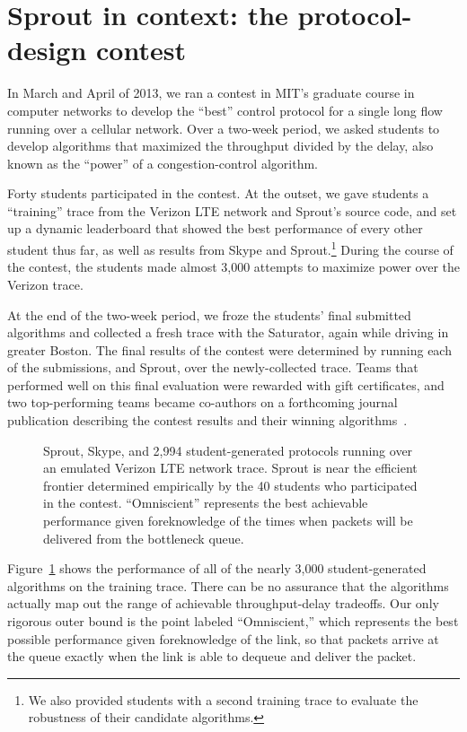 \section{Sprout in context: the protocol-design contest}
\label{s:cc-contest}

In March and April of 2013, we ran a contest in MIT's graduate course in computer
networks to develop the ``best'' control protocol for a single long flow
running over a cellular network. Over a two-week period, we asked
students to develop algorithms that maximized the throughput divided
by the delay, also known as the ``power'' of a congestion-control
algorithm.

Forty students participated in the contest. At the outset, we gave
students a ``training'' trace from the Verizon LTE network and
Sprout's source code, and set up a dynamic leaderboard that showed the
best performance of every other student thus far, as well as results
from Skype and Sprout.\footnote{We also provided students with a
  second training trace to evaluate the robustness of their candidate
  algorithms.} During the course of the contest, the students made
almost 3,000 attempts to maximize power over the Verizon trace.

At the end of the two-week period, we froze the students' final
submitted algorithms and collected a fresh trace with the
Saturator, again while driving in greater Boston. The final results of the
contest were determined by running each of the submissions, and
Sprout, over the newly-collected trace. Teams that performed well on
this final evaluation were rewarded with gift certificates, and two
top-performing teams became co-authors on a forthcoming journal
publication describing the contest results and their
winning algorithms~\cite{cc-contest}.

\begin{figure}
\caption{Sprout, Skype, and 2,994 student-generated protocols running
  over an emulated Verizon LTE network trace. Sprout is near the
  efficient frontier determined empirically by the 40 students who
  participated in the contest. ``Omniscient'' represents the best
  achievable performance given foreknowledge of the times when packets
  will be delivered from the bottleneck queue.}
\vspace{\baselineskip}
\def\svgwidth{\columnwidth}
\label{fig:convex-hull}
\end{figure}

Figure~\ref{fig:convex-hull} shows the performance of all of the
nearly 3,000 student-generated algorithms on the training trace. There
can be no assurance that the algorithms actually map out the range of
achievable throughput-delay tradeoffs. Our only rigorous outer bound
is the point labeled ``Omniscient,'' which represents the best
possible performance given foreknowledge of the link, so that packets
arrive at the queue exactly when the link is able to dequeue and
deliver the packet.


